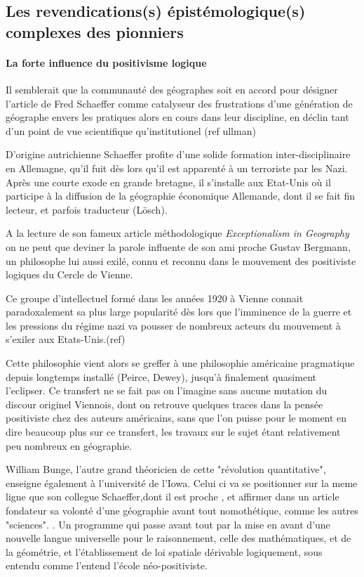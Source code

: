 {\subsection{Les revendications(s) épistémologique(s) complexes des pionniers }
\label{subsec:epistemo}

\paragraph{La forte influence du positivisme logique}

Il semblerait que la communauté des géographes soit en accord \autocite[15]{Louail2010} pour désigner l'article de Fred Schaeffer \autocite{Schaeffer1953} comme catalyseur des frustrations d'une génération de géographe envers les pratiques alors en cours dans leur discipline, en déclin tant d'un point de vue scientifique qu'institutionel (ref ullman)

D'origine autrichienne Schaeffer profite d'une solide formation inter-disciplinaire en Allemagne, qu'il fuit dès lors qu'il est apparenté à un terroriste par les Nazi. Après une courte exode en grande bretagne, il s'installe aux Etat-Unis où il participe à la diffusion de la géographie économique Allemande, dont il se fait fin lecteur, et parfois traducteur (Lösch). 

A la lecture de son fameux article méthodologique \textit{Exceptionalism in Geography} on ne peut que deviner la parole influente de son ami proche Gustav Bergmann, un philosophe lui aussi exilé, connu et reconnu dans le mouvement des positiviste logiques du Cercle de Vienne. 

Ce groupe d'intellectuel formé dans les années 1920 à Vienne connait paradoxalement sa plus large popularité dès lors que l'imminence de la guerre et les pressions du régime nazi va pousser de nombreux acteurs du mouvement à s'exiler aux Etats-Unis.(ref) 

Cette philosophie vient alors se greffer à une philosophie américaine pragmatique depuis longtemps installé (Peirce, Dewey), jusqu'à finalement quasiment l'eclipser. Ce transfert ne se fait pas on l'imagine sans aucune mutation du discour originel Viennois, dont on retrouve quelques traces dans la pensée positiviste chez des auteurs américains, sans que l'on puisse pour le moment en dire beaucoup plus sur ce transfert, les travaux sur le sujet étant relativement peu nombreux en géographie. \autocite{Orain}

William Bunge, l'autre grand théoricien de cette "révolution quantitative", enseigne également à l'université de l'Iowa. Celui ci va se positionner sur la meme ligne que son collegue Schaeffer,dont il est proche \autocite{Goodchild2001}, et affirmer dans un article fondateur \autocite{Bunge1962} sa volonté d'une géographie avant tout nomothétique, comme les autres "sciences".\autocite{Bunge1979} \autocite{Claval2003} \autocite[429-430]{Gregory2009}. Un programme qui passe avant tout par la mise en avant d'une nouvelle langue universelle pour le raisonnement, celle des mathématiques, et de la géométrie, et l'établissement de loi spatiale dérivable logiquement, sous entendu comme l'entend l'école néo-positiviste.

}
